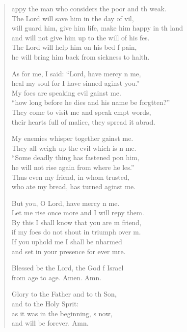 \begin{verse}
  \begin{patverse}
appy the man who considers the poor and th weak.\Med\\
The Lord will save him in the day of vil,\\
will guard him, give him life, make him happy in th land\Med\\
and will not give him up to the will of his fes.\\
The Lord will help him on his bed f pain,\Med\\
he will bring him back from sickness to halth.

As for me, I said: “Lord, have mercy n me,\Med\\
heal my soul for I have sinned aginst you.”\\
My foes are speaking evil gainst me.\Med\\
“how long before he dies and his name be forgtten?”\Med\\
They come to visit me and speak empt words,\\
their hearts full of malice, they spread it abrad.

My enemies whisper together gainst me.\Med\\
They all weigh up the evil which is n me.\\
“Some deadly thing has fastened pon him,\Med\\
he will not rise again from where he l\pointup{\i}es.”\\
Thus even my friend, in whom  trusted,\Med\\
who ate my bread, has turned aginst me.

But you, O Lord, have mercy n me.\Med\\
Let me rise once more and I will repy them.\\
By this I shall know that you are m friend,\Med\\
if my foes do not shout in triumph over m.\\
If you uphold me I shall be nharmed\Med\\
and set in your presence for ever mre.

Blessed be the Lord, the God f Israel\Med\\
from age to age. Amen. Amn.

Glory to the Father and to th Son,\Med\\
and to the Holy Sp\pointup{\i}rit:\\
as it was in the beginning, \pointup{\i}s now,\Med\\
and will be forever. Amn. 
  \end{patverse}
\end{verse}

